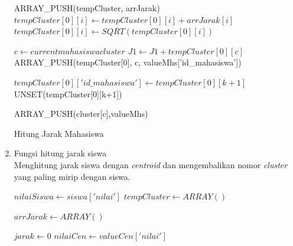 \begin{enumerate}
\begin{algorithm}[H]
\begin{algorithmic}[1]
                            \State ARRAY\_PUSH(tempCluster, arrJarak)
                        \Else
                                \State $tempCluster[0][i] \gets tempCluster[0][i]+ arrJarak[i]$
                                \State $tempCluster[0][i] \gets SQRT(tempCluster[0][i])$
                            \EndFor
                        \EndIf
                        
                        \State $c \gets current mahasiswa cluster$
                        \State $J1 \gets J1 + tempCluster[0][c]$
                        \State ARRAY\_PUSH(tempCluster[0], c, valueMhs['id\_mahasiswa'])
                        
                        \State $tempCluster[0]['id\_mahasiswa'] \gets tempCluster[0][k+1]$
                        \State UNSET(tempCluster[0][k+1])
                        
                        \State ARRAY\_PUSH(cluster[c],valueMhs)
                    \EndFor
                \EndProcedure
            \end{algorithmic} 
            \caption{Hitung Jarak Mahasiswa}
            \label{alg:hitungJarakMhs}
        \end{algorithm}
    
    \item Fungsi hitung jarak siswa \\
        Menghitung jarak siswa dengan \textit{centroid} dan mengembalikan nomor \textit{cluster} yang paling mirip dengan siswa.\\
        
        \begin{algorithm}[H]
            \begin{algorithmic}[1]
                    \State $nilaiSiswa \gets siswa['nilai']$
                    \State $tempCluster \gets ARRAY()$
                    
                        \State $arrJarak \gets ARRAY()$
                        
                            \State $jarak \gets 0$
                            \State $nilaiCen \gets valueCen['nilai']$
                            

\end{algorithmic}
\end{algorithm}
\end{enumerate}
